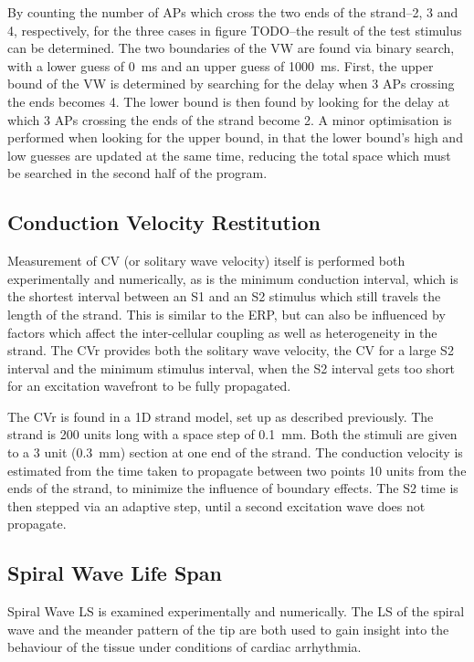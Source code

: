 By counting the number of APs which cross the two ends of the strand--2, 3 and
4, respectively, for the three cases in figure TODO--the result of the test
stimulus can be determined.  The two boundaries of the VW are found via binary
search, with a lower guess of 0~ms and an upper guess of 1000~ms.  First, the
upper bound of the VW is determined by searching for the delay when 3 APs
crossing the ends becomes 4.  The lower bound is then found by looking for the
delay at which 3 APs crossing the ends of the strand become 2.  A minor
optimisation is performed when looking for the upper bound, in that the lower
bound's high and low guesses are updated at the same time, reducing the total
space which must be searched in the second half of the program.

\subsection{Conduction Velocity Restitution}

Measurement of CV (or solitary wave velocity) itself is performed both
experimentally and numerically, as is the minimum conduction interval, which is
the shortest interval between an S1 and an S2 stimulus which still travels the
length of the strand.  This is similar to the ERP, but can also be influenced by
factors which affect the inter-cellular coupling as well as heterogeneity in the
strand.  The CVr provides both the solitary wave velocity, the CV for a large S2
interval and the minimum stimulus interval, when the S2 interval gets too short
for an excitation wavefront to be fully propagated.

The CVr is found in a 1D strand model, set up as described previously.  The
strand is 200 units long with a space step of 0.1~mm.  Both the stimuli are
given to a 3 unit (0.3~mm) section at one end of the strand.  The conduction
velocity is estimated from the time taken to propagate between two points 10
units from the ends of the strand, to minimize the influence of boundary
effects.  The S2 time is then stepped via an adaptive step, until a second
excitation wave does not propagate.

\subsection{Spiral Wave Life Span}

Spiral Wave LS is examined experimentally and numerically.  The LS of the spiral
wave and the meander pattern of the tip are both used to gain insight into the
behaviour of the tissue under conditions of cardiac arrhythmia.

